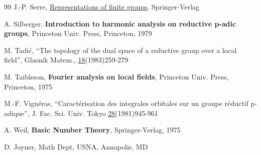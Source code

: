 \begin{thebibliography}{99}
  J.-P. Serre, \underline{Representations of finite groups},
Springer-Verlag

  A. Silberger, {\bf Introduction to harmonic analysis on reductive
    p-adic groups}, Princeton Univ. Press, Princeton, 1979

  M. Tadi\'c, ``The topology of the dual space of a reductive group over a
local field'', Glasnik Matem., \underline{18}(1983)259-279

  M. Taibleson, {\bf Fourier analysis on local fields},
  Princeton Univ. Press, Princeton, 1975

  M.-F. Vign\'eras, ``Caract\'erisation des integrales orbitales sur un
  groupe r\'eductif p-adique'', J. Fac. Sci. Univ. Tokyo
  \underline{28}(1981)945-961

  A. Weil, {\bf Basic Number Theory}, Springer-Verlag, 1975

\end{thebibliography}
D. Joyner, Math Dept, USNA, Annapolis, MD



